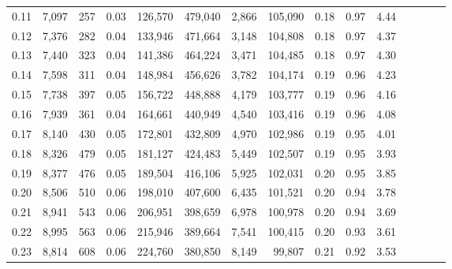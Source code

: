 \begin{tabular}{rrrcrrrrrrrrrrr}
0.11 &   7,097 &     257 &                                       0.03 &  126,570 &  479,040 &    2,866 &  105,090 &  0.18 &  0.97 &                         4.44 \\
0.12 &   7,376 &     282 &                                       0.04 &  133,946 &  471,664 &    3,148 &  104,808 &  0.18 &  0.97 &                         4.37 \\
0.13 &   7,440 &     323 &                                       0.04 &  141,386 &  464,224 &    3,471 &  104,485 &  0.18 &  0.97 &                         4.30 \\
0.14 &   7,598 &     311 &                                       0.04 &  148,984 &  456,626 &    3,782 &  104,174 &  0.19 &  0.96 &                         4.23 \\
0.15 &   7,738 &     397 &                                       0.05 &  156,722 &  448,888 &    4,179 &  103,777 &  0.19 &  0.96 &                         4.16 \\
0.16 &   7,939 &     361 &                                       0.04 &  164,661 &  440,949 &    4,540 &  103,416 &  0.19 &  0.96 &                         4.08 \\
0.17 &   8,140 &     430 &                                       0.05 &  172,801 &  432,809 &    4,970 &  102,986 &  0.19 &  0.95 &                         4.01 \\
0.18 &   8,326 &     479 &                                       0.05 &  181,127 &  424,483 &    5,449 &  102,507 &  0.19 &  0.95 &                         3.93 \\
0.19 &   8,377 &     476 &                                       0.05 &  189,504 &  416,106 &    5,925 &  102,031 &  0.20 &  0.95 &                         3.85 \\
0.20 &   8,506 &     510 &                                       0.06 &  198,010 &  407,600 &    6,435 &  101,521 &  0.20 &  0.94 &                         3.78 \\
0.21 &   8,941 &     543 &                                       0.06 &  206,951 &  398,659 &    6,978 &  100,978 &  0.20 &  0.94 &                         3.69 \\
0.22 &   8,995 &     563 &                                       0.06 &  215,946 &  389,664 &    7,541 &  100,415 &  0.20 &  0.93 &                         3.61 \\
0.23 &   8,814 &     608 &                                       0.06 &  224,760 &  380,850 &    8,149 &   99,807 &  0.21 &  0.92 &                         3.53 \\

\end{tabular}

